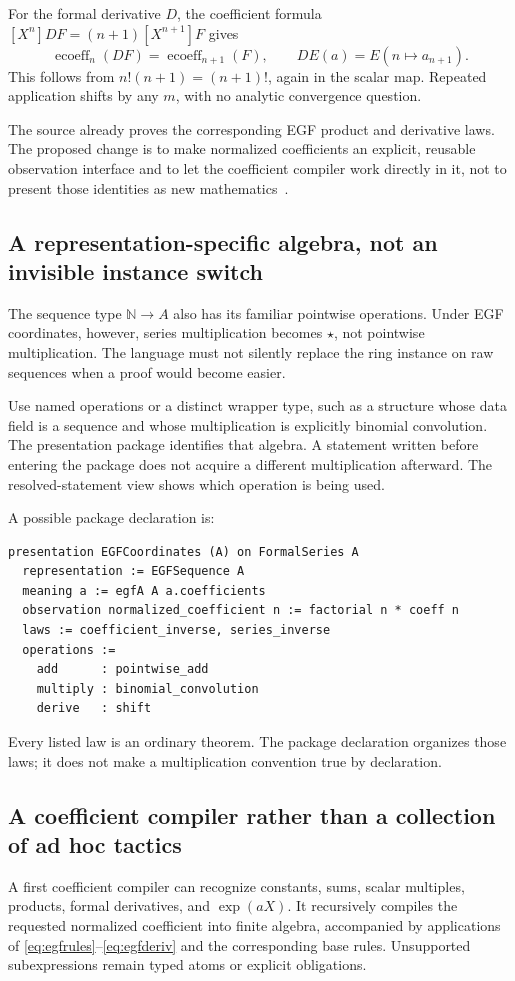 \documentclass[11pt,a4paper]{article}
\newcommand{\N}{\mathbb N}
\newcommand{\ecoeff}{\operatorname{ecoeff}}
\theoremstyle{definition}
\begin{document}
For the formal derivative \(D\), the coefficient formula
\([X^n]DF=(n+1)[X^{n+1}]F\) gives
\begin{equation}\label{eq:egfderiv}
 \ecoeff_n(DF)=\ecoeff_{n+1}(F),
 \qquad D E(a)=E(n\mapsto a_{n+1}).
\end{equation}
This follows from \(n!(n+1)=(n+1)!\), again in the scalar map. Repeated
application shifts by any \(m\), with no analytic convergence question.

The source already proves the corresponding EGF product and derivative laws.
The proposed change is to make normalized coefficients an explicit, reusable
observation interface and to let the coefficient compiler work directly in it,
not to present those identities as new mathematics~\cite{p-egf}.

\subsection{A representation-specific algebra, not an invisible instance switch}
The sequence type \(\N\to A\) also has its familiar pointwise operations. Under
EGF coordinates, however, series multiplication becomes \(\star\), not pointwise
multiplication. The language must not silently replace the ring instance on raw
sequences when a proof would become easier.

Use named operations or a distinct wrapper type, such as a structure whose data
field is a sequence and whose multiplication is explicitly binomial convolution.
The presentation package identifies that algebra. A statement written before
entering the package does not acquire a different multiplication afterward.
The resolved-statement view shows which operation is being used.

A possible package declaration is:
\begin{lstlisting}
presentation EGFCoordinates (A) on FormalSeries A
  representation := EGFSequence A
  meaning a := egfA A a.coefficients
  observation normalized_coefficient n := factorial n * coeff n
  laws := coefficient_inverse, series_inverse
  operations :=
    add      : pointwise_add
    multiply : binomial_convolution
    derive   : shift
\end{lstlisting}

Every listed law is an ordinary theorem. The package declaration organizes those
laws; it does not make a multiplication convention true by declaration.

\subsection{A coefficient compiler rather than a collection of ad hoc tactics}
A first coefficient compiler can recognize constants, sums, scalar multiples,
products, formal derivatives, and \(\exp(aX)\). It recursively compiles the
requested normalized coefficient into finite algebra, accompanied by applications
of \eqref{eq:egfrules}--\eqref{eq:egfderiv} and the corresponding base rules.
Unsupported subexpressions remain typed atoms or explicit obligations.
\end{document}
